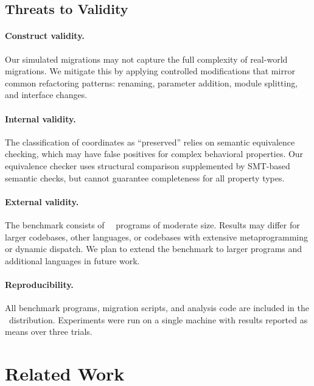 \documentclass[11pt]{article}
\begin{document}
\subsection{Threats to Validity}\label{sec:threats}

\paragraph{Construct validity.}
Our simulated migrations may not capture the full complexity of real-world
migrations.  We mitigate this by applying controlled modifications that
mirror common refactoring patterns: renaming, parameter addition, module
splitting, and interface changes.

\paragraph{Internal validity.}
The classification of coordinates as ``preserved'' relies on semantic
equivalence checking, which may have false positives for complex behavioral
properties.  Our equivalence checker uses structural comparison
supplemented by SMT-based semantic checks, but cannot guarantee
completeness for all property types.

\paragraph{External validity.}
The benchmark consists of \compTotalPrograms\ \Python\ programs of
moderate size.  Results may differ for larger codebases, other languages,
or codebases with extensive metaprogramming or dynamic dispatch.  We plan
to extend the benchmark to larger programs and additional languages in
future work.

\paragraph{Reproducibility.}
All benchmark programs, migration scripts, and analysis code are included
in the \JuGeo\ distribution.  Experiments were run on a single machine
with results reported as means over three trials.

\section{Related Work}\label{sec:related}
\end{document}
